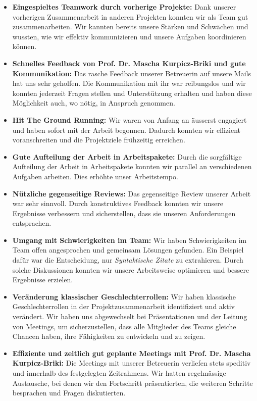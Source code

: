 \begin{itemize}
    \item \textbf{Eingespieltes Teamwork durch vorherige Projekte:} Dank unserer vorherigen Zusammenarbeit in anderen Projekten konnten wir als Team gut zusammenarbeiten. Wir kannten bereits unsere Stärken und Schwächen und wussten, wie wir effektiv kommunizieren und unsere Aufgaben koordinieren können.
    \item \textbf{Schnelles Feedback von Prof. Dr. Mascha Kurpicz-Briki und gute Kommunikation:}  Das rasche Feedback unserer Betreuerin auf unsere Mails hat uns sehr geholfen. Die Kommunikation mit ihr war reibungslos und wir konnten jederzeit Fragen stellen und Unterstützung erhalten und haben diese Möglichkeit auch, wo nötig, in Anspruch genommen.
    \item \textbf{Hit The Ground Running:} Wir waren von Anfang an äusserst engagiert und haben sofort mit der Arbeit begonnen. Dadurch konnten wir effizient voranschreiten und die Projektziele frühzeitig erreichen.
    \item \textbf{Gute Aufteilung der Arbeit in Arbeitspakete:} Durch die sorgfältige Aufteilung der Arbeit in Arbeitspakete konnten wir parallel an verschiedenen Aufgaben arbeiten. Dies erhöhte unser Arbeitstempo.
    \item \textbf{Nützliche gegenseitige Reviews:} Das gegenseitige Review unserer Arbeit war sehr sinnvoll. Durch konstruktives Feedback konnten wir unsere Ergebnisse verbessern und sicherstellen, dass sie unseren Anforderungen entsprachen.
    \item \textbf{Umgang mit Schwierigkeiten im Team:} Wir haben Schwierigkeiten im Team offen angesprochen und gemeinsam Lösungen gefunden. Ein Beispiel dafür war die Entscheidung, nur \textsl{Syntaktische Zitate} zu extrahieren. Durch solche Diskussionen konnten wir unsere Arbeitsweise optimieren und bessere Ergebnisse erzielen.
    \item \textbf{Veränderung klassischer Geschlechterrollen:} Wir haben klassische Geschlechterrollen in der Projektzusammenarbeit identifiziert und aktiv verändert. Wir haben uns abgewechselt bei Präsentationen und der Leitung von Meetings, um sicherzustellen, dass alle Mitglieder des Teams gleiche Chancen haben, ihre Fähigkeiten zu entwickeln und zu zeigen.
    \item \textbf{Effiziente und zeitlich gut geplante Meetings mit Prof. Dr. Mascha Kurpicz-Briki:} Die Meetings mit unserer Betreuerin verliefen stets speditiv und innerhalb des festgelegten Zeitrahmens. Wir hatten regelmässige Austausche, bei denen wir den Fortschritt präsentierten, die weiteren Schritte besprachen und Fragen diskutierten.

\end{itemize}
